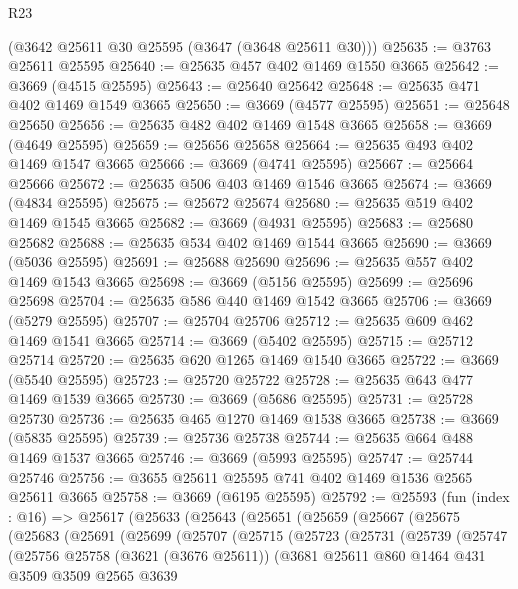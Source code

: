 \begin{lexlean}{R23}
\begin{coremodule}
    (@3642 @25611 @30 @25595 (@3647 (@3648 @25611 @30)))
@25635 := @3763 @25611 @25595
@25640 := @25635 @457 @402 @1469 @1550 @3665
@25642 := @3669 (@4515 @25595)
@25643 := @25640 @25642
@25648 := @25635 @471 @402 @1469 @1549 @3665
@25650 := @3669 (@4577 @25595)
@25651 := @25648 @25650
@25656 := @25635 @482 @402 @1469 @1548 @3665
@25658 := @3669 (@4649 @25595)
@25659 := @25656 @25658
@25664 := @25635 @493 @402 @1469 @1547 @3665
@25666 := @3669 (@4741 @25595)
@25667 := @25664 @25666
@25672 := @25635 @506 @403 @1469 @1546 @3665
@25674 := @3669 (@4834 @25595)
@25675 := @25672 @25674
@25680 := @25635 @519 @402 @1469 @1545 @3665
@25682 := @3669 (@4931 @25595)
@25683 := @25680 @25682
@25688 := @25635 @534 @402 @1469 @1544 @3665
@25690 := @3669 (@5036 @25595)
@25691 := @25688 @25690
@25696 := @25635 @557 @402 @1469 @1543 @3665
@25698 := @3669 (@5156 @25595)
@25699 := @25696 @25698
@25704 := @25635 @586 @440 @1469 @1542 @3665
@25706 := @3669 (@5279 @25595)
@25707 := @25704 @25706
@25712 := @25635 @609 @462 @1469 @1541 @3665
@25714 := @3669 (@5402 @25595)
@25715 := @25712 @25714
@25720 := @25635 @620 @1265 @1469 @1540 @3665
@25722 := @3669 (@5540 @25595)
@25723 := @25720 @25722
@25728 := @25635 @643 @477 @1469 @1539 @3665
@25730 := @3669 (@5686 @25595)
@25731 := @25728 @25730
@25736 := @25635 @465 @1270 @1469 @1538 @3665
@25738 := @3669 (@5835 @25595)
@25739 := @25736 @25738
@25744 := @25635 @664 @488 @1469 @1537 @3665
@25746 := @3669 (@5993 @25595)
@25747 := @25744 @25746
@25756 := @3655 @25611 @25595 @741 @402 @1469 @1536 @2565 @25611 @3665
@25758 := @3669 (@6195 @25595)
@25792 := @25593
    (fun (index : @16) =>
    @25617
      (@25633
        (@25643
          (@25651
            (@25659
              (@25667
                (@25675
                  (@25683
                    (@25691
                      (@25699
                        (@25707
                          (@25715
                            (@25723
                              (@25731
                                (@25739
                                  (@25747
                                    (@25756
                                      @25758
                                      (@3621 (@3676 @25611))
                                      (@3681
                                        @25611
                                        @860
                                        @1464
                                        @431
                                        @3509
                                        @3509
                                        @2565
                                        @3639

\end{coremodule}
\end{lexlean}
